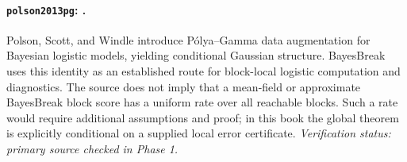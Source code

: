 
\paragraph{\texttt{polson2013pg}: \citet{polson2013pg}.}
Polson, Scott, and Windle introduce P\'olya--Gamma data augmentation for Bayesian logistic models, yielding conditional Gaussian structure. BayesBreak uses this identity as an established route for block-local logistic computation and diagnostics. The source does not imply that a mean-field or approximate BayesBreak block score has a uniform rate over all reachable blocks. Such a rate would require additional assumptions and proof; in this book the global theorem is explicitly conditional on a supplied local error certificate. \textit{Verification status: primary source checked in Phase 1.}
